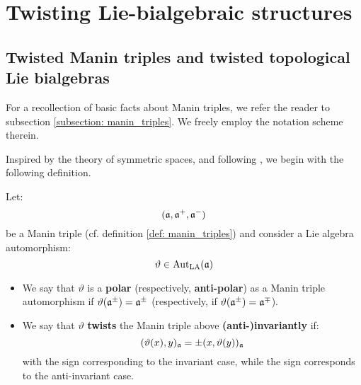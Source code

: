 \section{Twisting Lie-bialgebraic structures}
    \subsection{Twisted Manin triples and twisted topological Lie bialgebras} \label{subsection: twisted_manin_triples}
        For a recollection of basic facts about Manin triples, we refer the reader to subsection \ref{subsection: manin_triples}. We freely employ the notation scheme therein.

        Inspired by the theory of symmetric spaces, and following \cite{belliard_crampe_coideal_subalgebras_from_twisted_manin_triples}, we begin with the following definition.
        \begin{definition} \label{def: twisted_manin_triples}
            Let:
                $$(\mathfrak{a}, \mathfrak{a}^+, \mathfrak{a}^-)$$
            be a Manin triple (cf. definition \ref{def: manin_triples}) and consider a Lie algebra automorphism:
                $$\vartheta \in \operatorname{Aut}_{\mathrm{LA}}(\mathfrak{a})$$
            \begin{itemize}
                \item We say that $\vartheta$ is a \textbf{polar} (respectively, \textbf{anti-polar}) as a Manin triple automorphism if $\vartheta(\mathfrak{a}^{\pm}) = \mathfrak{a}^{\pm}$ (respectively, if $\vartheta(\mathfrak{a}^{\pm}) = \mathfrak{a}^{\mp}$).
                \item We say that $\vartheta$ \textbf{twists} the Manin triple above \textbf{(anti-)invariantly} if:
                    $$(\vartheta(x), y)_{\mathfrak{a}} = \pm (x, \vartheta(y))_{\mathfrak{a}}$$
                with the \say{$+$} sign corresponding to the invariant case, while the \say{$-$} sign corresponds to the anti-invariant case.
            \end{itemize}
        \end{definition}
